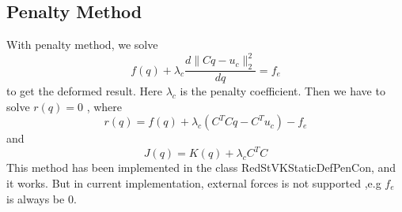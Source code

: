 \documentclass[twocolumn]{article}
\begin{document}
\subsection{Penalty Method}
With penalty method, we solve 
\[
f(q)+ \lambda_c \frac{d\|Cq-u_c\|_2^2}{dq}= f_{e} 
\]
to get the deformed result. Here $\lambda_c$ is the penalty coefficient. Then we
have to solve $r(q) = 0$ , where
\[
r(q) = f(q)+ \lambda_c (C^TCq - C^Tu_c)-f_{e} 
\]
and 
\[
J(q) = K(q) + \lambda_c C^TC
\]
This method has been implemented in the class RedStVKStaticDefPenCon, and it
works. But in current implementation, external forces is not supported ,e.g
$f_{e}$ is always be 0.
\end{document}
